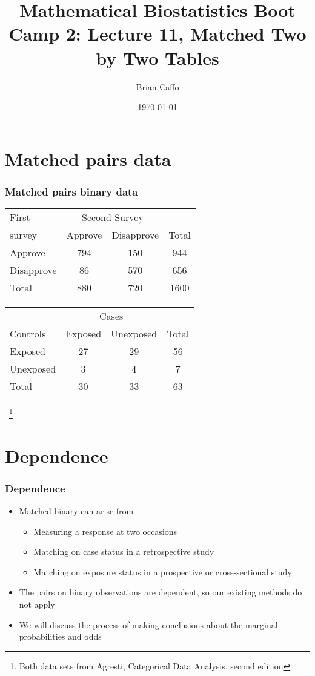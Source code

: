 \documentclass[aspectratio=169]{beamer}
\title{Mathematical Biostatistics Boot Camp 2: 
Lecture 11, Matched Two by Two Tables}
\author{Brian Caffo}
\date{\today}
\institute[Department of Biostatistics]{
  Department of Biostatistics \\
  Johns Hopkins Bloomberg School of Public Health\\
  Johns Hopkins University
}
\begin{document}
\frame{\titlepage}


\section{Matched pairs data}
\begin{frame}\frametitle{Matched pairs binary data}
\begin{center}
\ttfamily
  \begin{tabular}{lccc}
First & \multicolumn{2}{c}{Second Survey} & \\ \cline{2-3}
survey & Approve & Disapprove & Total \\ \hline
Approve & 794 & 150 & 944 \\
Disapprove & 86 & 570 & 656 \\
Total & 880 & 720 & 1600 \\ \hline
  \end{tabular}
\normalfont
\end{center}
\begin{center}
\ttfamily
  \begin{tabular}{lccc}
          & \multicolumn{2}{c}{Cases} & \\ \cline{2-3}
Controls  & Exposed & Unexposed & Total \\ \hline
Exposed   & 27      & 29        & 56  \\
Unexposed &  3      &  4        &  7  \\
Total     & 30      &  33       & 63   \\ \hline
  \end{tabular}
\normalfont
\end{center}
~\footnote{Both data sets from Agresti, Categorical Data Analysis, second edition}
\end{frame}

\section{Dependence}
\begin{frame}\frametitle{Dependence}
\begin{itemize}
\item Matched binary can arise from
  \begin{itemize}
  \item Measuring a response at two occasions
  \item Matching on case status in a retrospective study
  \item Matching on exposure status in a prospective or cross-sectional study
  \end{itemize}
\item The pairs on binary observations are dependent, so our
  existing methods do not apply
\item We will discuss the process of making conclusions about
  the marginal probabilities and odds
\end{itemize}
\end{frame}
\end{document}
